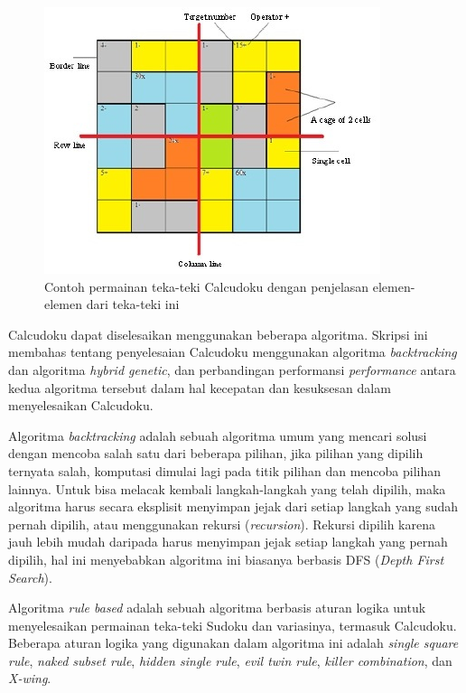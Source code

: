 \begin{figure}
\centering
\captionsetup{justification=centering}
\includegraphics[scale=1]{Gambar/HybridGenetic1}
\caption[Contoh permainan teka-teki Calcudoku dengan penjelasan tentang elemen-elemen dari teka-teki ini  ~\cite{johanna:12:hybrid}]{Contoh permainan teka-teki Calcudoku dengan penjelasan elemen-elemen dari teka-teki ini  ~\cite{johanna:12:hybrid}}
\label{fig:hybrid1}
\end{figure}

Calcudoku dapat diselesaikan menggunakan beberapa algoritma. Skripsi ini membahas tentang penyelesaian Calcudoku menggunakan algoritma \textit{backtracking} dan algoritma \textit{hybrid genetic}, dan perbandingan performansi \textit{performance} antara kedua algoritma tersebut dalam hal kecepatan dan kesuksesan dalam menyelesaikan Calcudoku.

Algoritma \textit{backtracking} adalah sebuah algoritma umum yang mencari solusi dengan mencoba salah satu dari beberapa pilihan, jika pilihan yang dipilih ternyata salah, komputasi dimulai lagi pada titik pilihan dan mencoba pilihan lainnya. Untuk bisa melacak kembali langkah-langkah yang telah dipilih, maka algoritma harus secara eksplisit menyimpan jejak dari setiap langkah yang sudah pernah dipilih, atau menggunakan rekursi (\textit{recursion}). Rekursi dipilih karena jauh lebih mudah daripada harus menyimpan jejak setiap langkah yang pernah dipilih, hal ini menyebabkan algoritma ini biasanya berbasis DFS (\textit{Depth First Search}). ~\cite{fahda:16:backtracking}

Algoritma \textit{rule based} adalah sebuah algoritma berbasis aturan logika untuk menyelesaikan permainan teka-teki Sudoku dan variasinya, termasuk Calcudoku. Beberapa aturan logika yang digunakan dalam algoritma ini adalah \textit{single square rule}, \textit{naked subset rule}, \textit{hidden single rule}, \textit{evil twin rule}, \textit{killer combination}, dan \textit{X-wing}.

